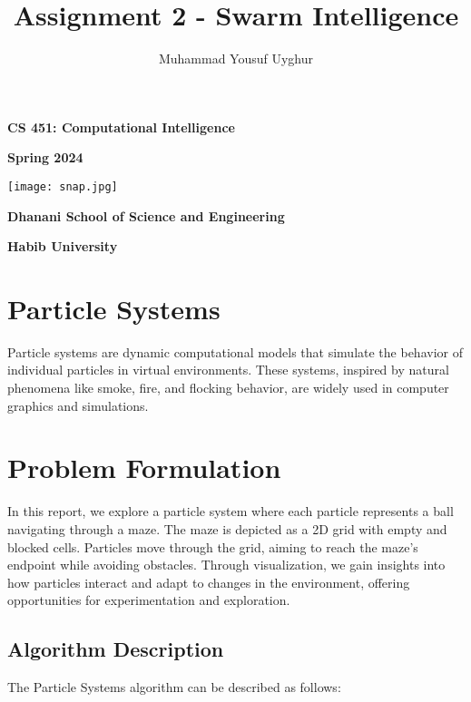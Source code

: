 \documentclass{article}
\title{Assignment 2 - Swarm Intelligence}
\author{Muhammad Yousuf Uyghur}
\date{}
\begin{document}
\begin{titlepage}
    \centering

    \vspace{1cm}

    \textbf{\large CS 451: Computational Intelligence}

    \vspace{0.5cm}

    \textbf{\large Spring 2024}

    \vspace{1cm}
    \texttt{[image: snap.jpg]}

    \vfill

    \textbf{\Large Dhanani School of Science and Engineering}

    \vspace{0.5cm}

    \textbf{\large Habib University}

    \vfill

\end{titlepage}

\maketitle

\section{Particle Systems}
Particle systems are dynamic computational models that simulate the behavior of individual particles in virtual environments. These systems, inspired by natural phenomena like smoke, fire, and flocking behavior, are widely used in computer graphics and simulations.

\section{Problem Formulation}
In this report, we explore a particle system where each particle represents a ball navigating through a maze. The maze is depicted as a 2D grid with empty and blocked cells. Particles move through the grid, aiming to reach the maze's endpoint while avoiding obstacles. Through visualization, we gain insights into how particles interact and adapt to changes in the environment, offering opportunities for experimentation and exploration.

\subsection{Algorithm Description}
The Particle Systems algorithm can be described as follows:
\end{document}
